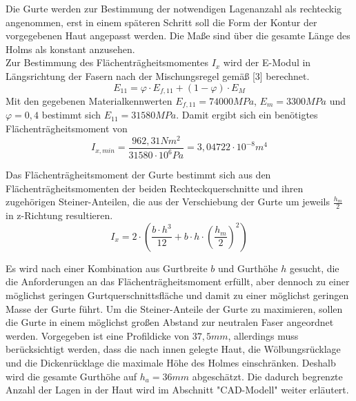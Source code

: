 \noindent Die Gurte werden zur Bestimmung der notwendigen Lagenanzahl als rechteckig angenommen, erst in einem späteren Schritt soll die Form der Kontur der vorgegebenen Haut angepasst werden. Die Maße sind über die gesamte Länge des Holms als konstant anzusehen.\\
Zur Bestimmung des Flächenträgheitsmomentes $ I_{x} $ wird der E-Modul in Längsrichtung der Fasern nach der Mischungsregel gemäß [3] berechnet.\\
\begin{equation}
 E_{11}=  \varphi\cdot E_{f,11}+\left( 1-\varphi \right) \cdot E_{M}
\end{equation}
Mit den gegebenen Materialkennwerten $ E_{f,11}=74000MPa $, $ E_{m}=3300MPa $ und $ \varphi=0,4 $ bestimmt sich $ E_{11} = 31580 MPa $. Damit ergibt sich ein benötigtes Flächenträgheitsmoment von 
\begin{equation}
	I_{x,min} = \frac{962,31Nm^{2}}{31580\cdot 10^{6}Pa} =3,04722 \cdot 10^{-8} m^{4}
\end{equation}

\noindent Das Flächenträgheitsmoment der Gurte bestimmt sich aus den Flächenträgheitsmomenten der beiden Rechteckquerschnitte und ihren zugehörigen Steiner-Anteilen, die aus der Verschiebung der Gurte um jeweils $ \frac{h_{m}}{2} $ in z-Richtung resultieren.
\begin{equation}
	\label{Ix}
	I_{x}=2\cdot\left(\frac{b\cdot h^{3}}{12}+b\cdot h\cdot\left(\frac{h_{m}}{2}\right)^{2}\right)
\end{equation}

\noindent Es wird nach einer Kombination aus Gurtbreite $ b $ und Gurthöhe $ h $ gesucht, die die Anforderungen an das Flächenträgheitsmoment erfüllt, aber dennoch zu einer möglichst geringen Gurtquerschnittsfläche und damit zu einer möglichst geringen Masse der Gurte führt. Um die Steiner-Anteile der Gurte zu maximieren, sollen die Gurte in einem möglichst großen Abstand zur neutralen Faser angeordnet werden. Vorgegeben ist eine Profildicke von $ 37,5mm $, allerdings muss berücksichtigt werden, dass die nach innen gelegte Haut, die Wölbungsrücklage und die Dickenrücklage die maximale Höhe des Holmes einschränken. Deshalb wird die gesamte Gurthöhe auf $ h_{a}=36mm $ abgeschätzt. Die dadurch begrenzte Anzahl der Lagen in der Haut wird im Abschnitt "CAD-Modell" weiter erläutert.\\ 

